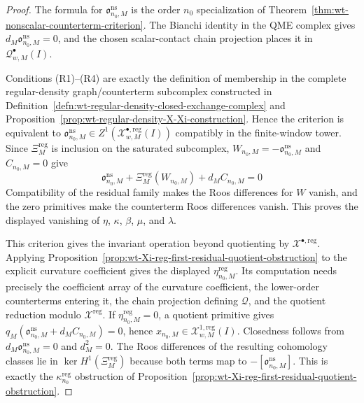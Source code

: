\begin{proof}
  The formula for \(\mathfrak o^{\mathrm{ns}}_{n_0,M}\) is the order
  \(n_0\) specialization of
  Theorem~\ref{thm:wt-nonscalar-counterterm-criterion}.  The Bianchi
  identity in the QME complex gives
  \(d_M\mathfrak o^{\mathrm{ns}}_{n_0,M}=0\), and the chosen
  scalar-contact chain projection places it in
  \(\mathcal Q^\bullet_{w,M}(I)\).

  Conditions (R1)--(R4) are exactly the definition of membership in the
  complete regular-density graph/counterterm subcomplex constructed in
  Definition~\ref{defn:wt-regular-density-closed-exchange-complex} and
  Proposition~\ref{prop:wt-regular-density-X-Xi-construction}.  Hence the
  criterion is equivalent to
  \(\mathfrak o^{\mathrm{ns}}_{n_0,M}\in
  Z^1(\mathcal X^{\bullet,\mathrm{reg}}_{w,M}(I))\) compatibly in the
  finite-window tower.  Since
  \(\Xi^{\mathrm{reg}}_M\) is inclusion on the saturated subcomplex,
  \(W_{n_0,M}=-\mathfrak o^{\mathrm{ns}}_{n_0,M}\) and
  \(C_{n_0,M}=0\) give
  \[
    \mathfrak o^{\mathrm{ns}}_{n_0,M}
    +\Xi^{\mathrm{reg}}_M(W_{n_0,M})
    +d_MC_{n_0,M}=0
  \]
  Compatibility of the residual family makes the Roos differences for
  \(W\) vanish, and the zero primitives make the counterterm Roos
  differences vanish.  This proves the displayed vanishing of
  \(\eta\), \(\kappa\), \(\beta\), \(\mu\), and \(\lambda\).

  This criterion gives the invariant operation beyond quotienting by
  \(\mathcal X^{\bullet,\mathrm{reg}}\).  Applying
  Proposition~\ref{prop:wt-Xi-reg-first-residual-quotient-obstruction} to
  the explicit curvature coefficient gives the displayed
  \(\eta^{\mathrm{reg}}_{n_0,M}\).  Its computation needs precisely the
  coefficient array of the curvature coefficient, the lower-order
  counterterms entering it, the chain projection defining
  \(\mathcal Q\), and the quotient reduction modulo
  \(\mathcal X^{\mathrm{reg}}\).  If \(\eta^{\mathrm{reg}}_{n_0,M}=0\),
  a quotient primitive gives
  \(q_M(\mathfrak o^{\mathrm{ns}}_{n_0,M}+d_MC_{n_0,M})=0\), hence
  \(x_{n_0,M}\in\mathcal X^{1,\mathrm{reg}}_{w,M}(I)\).  Closedness follows
  from \(d_M\mathfrak o^{\mathrm{ns}}_{n_0,M}=0\) and \(d_M^2=0\).  The
  Roos differences of the resulting cohomology classes lie in
  \(\ker H^1(\Xi^{\mathrm{reg}}_M)\) because both terms map to
  \(-[\mathfrak o^{\mathrm{ns}}_{n_0,M}]\).  This is exactly the
  \(\kappa^{\mathrm{reg}}_{n_0}\) obstruction of
  Proposition~\ref{prop:wt-Xi-reg-first-residual-quotient-obstruction}.
\end{proof}

